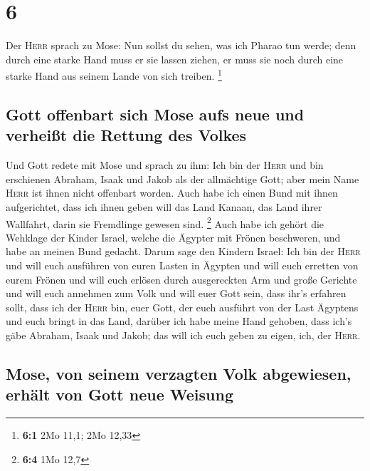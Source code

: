 \hypertarget{section-5}{%
\section{6}\label{section-5}}

 Der \textsc{Herr} sprach zu Mose: Nun sollst du sehen,
was ich Pharao tun werde; denn durch eine starke Hand muss er sie lassen
ziehen, er muss sie noch durch eine starke Hand aus seinem Lande von
sich treiben. \footnote{\textbf{6:1} 2Mo 11,1; 2Mo 12,33}

\hypertarget{gott-offenbart-sich-mose-aufs-neue-und-verheiuxdft-die-rettung-des-volkes}{%
\subsection{Gott offenbart sich Mose aufs neue und verheißt die Rettung
des
Volkes}\label{gott-offenbart-sich-mose-aufs-neue-und-verheiuxdft-die-rettung-des-volkes}}

 Und Gott redete mit Mose und sprach zu ihm: Ich bin der
\textsc{Herr}  und bin erschienen Abraham, Isaak und Jakob
als der allmächtige Gott; aber mein Name \textsc{Herr} ist ihnen nicht
offenbart worden.  Auch habe ich einen Bund mit ihnen
aufgerichtet, dass ich ihnen geben will das Land Kanaan, das Land ihrer
Wallfahrt, darin sie Fremdlinge gewesen sind. \footnote{\textbf{6:4} 1Mo
  12,7}  Auch habe ich gehört die Wehklage der Kinder
Israel, welche die Ägypter mit Frönen beschweren, und habe an meinen
Bund gedacht.  Darum sage den Kindern Israel: Ich bin der
\textsc{Herr} und will euch ausführen von euren Lasten in Ägypten und
will euch erretten von eurem Frönen und will euch erlösen durch
ausgereckten Arm und große Gerichte  und will euch
annehmen zum Volk und will euer Gott sein, dass ihr's erfahren sollt,
dass ich der \textsc{Herr} bin, euer Gott, der euch ausführt von der
Last Ägyptens  und euch bringt in das Land, darüber ich
habe meine Hand gehoben, dass ich's gäbe Abraham, Isaak und Jakob; das
will ich euch geben zu eigen, ich, der \textsc{Herr}.

\hypertarget{mose-von-seinem-verzagten-volk-abgewiesen-erhuxe4lt-von-gott-neue-weisung}{%
\subsection{Mose, von seinem verzagten Volk abgewiesen, erhält von Gott
neue
Weisung}\label{mose-von-seinem-verzagten-volk-abgewiesen-erhuxe4lt-von-gott-neue-weisung}}

